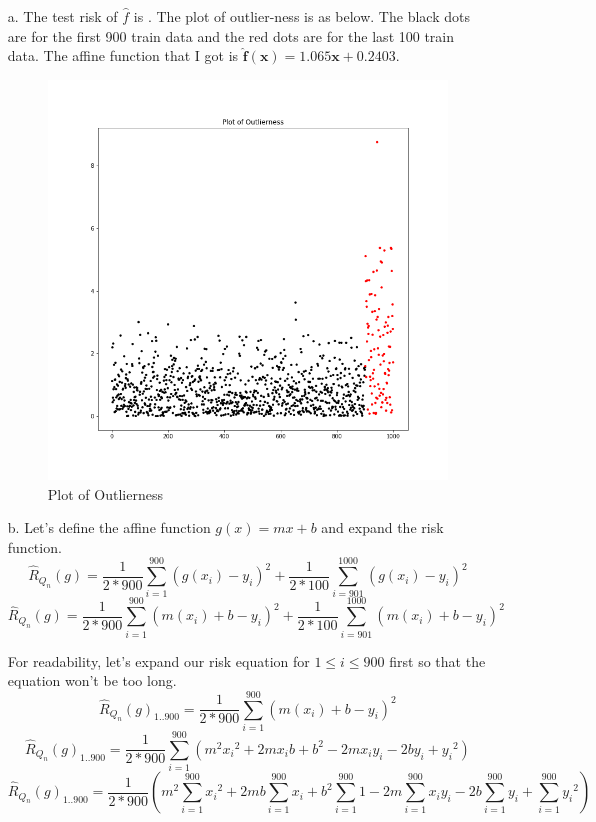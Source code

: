 \documentclass[twoside]{homework}
\begin{document}
\begin{itemize}
    \item[a.] The test risk of $\hat{f}$ is . The plot of outlier-ness is as below. The black dots are for the first 900 train data and the red dots are for the last 100 train data. The affine function that I got is $\boldsymbol{\hat{f}(x)= 1.065x + 0.2403}$.
    \item[]
        \begin{figure}[H]
            \includegraphics[scale=0.7]{q5_outlier_plot.png}
            \caption{Plot of Outlierness}
            \label{fig:plot_of_outi}
        \end{figure}
    \item[b.] Let's define the affine function $g(x)=mx+b$ and expand the risk function.
    $$\hat{R}_{Q_n}(g)=\frac{1}{2*900}\sum_{i=1}^{900}(g(x_i)-y_i)^2+\frac{1}{2*100}\sum_{i=901}^{1000}(g(x_i)-y_i)^2$$
    $$\hat{R}_{Q_n}(g)=\frac{1}{2*900}\sum_{i=1}^{900}(m(x_i)+b-y_i)^2+\frac{1}{2*100}\sum_{i=901}^{1000}(m(x_i)+b-y_i)^2$$

    For readability, let's expand our risk equation for $1\leq{i}\leq{900}$ first so that the equation won't be too long.
    $$\hat{R}_{Q_n}(g)_{{1..900}}=\frac{1}{2*900}\sum_{i=1}^{900}(m(x_i)+b-y_i)^2$$
    $$\hat{R}_{Q_n}(g)_{{1..900}}=\frac{1}{2*900}\sum_{i=1}^{900}(m^2{x_i}^2+2mx_ib+b^2-2mx_iy_i-2by_i+{y_i}^2)$$
    $$\hat{R}_{Q_n}(g)_{{1..900}}=\frac{1}{2*900}(m^2\sum_{i=1}^{900}{x_i}^2+2mb\sum_{i=1}^{900}x_i+b^2\sum_{i=1}^{900}1-2m\sum_{i=1}^{900}x_iy_i-2b\sum_{i=1}^{900}y_i+\sum_{i=1}^{900}{y_i}^2)$$


\end{itemize}
\end{document}
